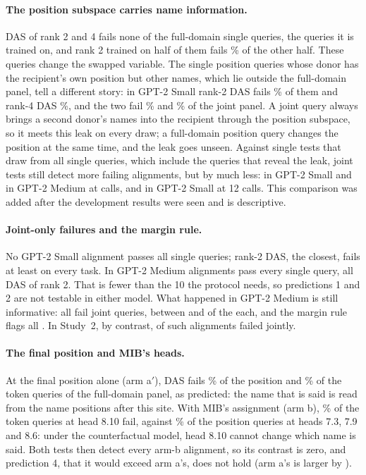 \paragraph{The position subspace carries name information.} DAS of rank 2 and 4 fails none of the full-domain single
queries, the queries it is trained on, and rank 2 trained on half of them fails \SplitHeldOutS\% of the other half.
These queries change the swapped variable. The single position queries whose donor has the recipient's own position
but other names, which lie outside the full-domain panel, tell a different story: in GPT-2 Small rank-2 DAS fails
\UnchRTwoS\% of them and rank-4 DAS \UnchRFourS\%, and the two fail \JointRTwoS\% and \JointRFourS\% of the joint panel.
A joint query always brings a second donor's names into the recipient through the position subspace, so it meets this
leak on every draw; a full-domain position query changes the position at the same time, and the leak goes unseen.
Against single tests that draw from all single queries, which include the queries that reveal the leak, joint tests
still detect more failing alignments, but by much less: \ContrastAllS{} in GPT-2 Small and \ContrastAllM{} in GPT-2
Medium at \Budget{} calls, and \ContrastAllSAtTwelve{} in GPT-2 Small at 12 calls. This comparison was added after the
development results were seen and is descriptive.

\paragraph{Joint-only failures and the margin rule.} No GPT-2 Small alignment passes all \NSingle{} single queries;
rank-2 DAS, the closest, fails at least \MinSingleFailRTwoS{} on every task. In GPT-2 Medium \PerfectWordM{} alignments
pass every single query, all DAS of rank 2. That is fewer than the 10 the protocol needs, so predictions 1 and 2 are
not testable in either model. What happened in GPT-2 Medium is still informative: all \PerfectWordM{} fail joint
queries, between \MedJointFailMin{} and \MedJointFailMax{} of the \NJoint{} each, and the margin rule flags all
\PerfectWordM. In Study~2, by contrast, \TrnPerfectJointFail{} of \TrnPerfect{} such alignments failed jointly.

\paragraph{The final position and MIB's heads.} At the final position alone (arm a$'$), DAS fails \EndRateA\% of the
position and \EndRateB\% of the token queries of the full-domain panel, as predicted: the name that is said is read
from the name positions after this site. With MIB's assignment (arm b), \HeadsRateB\% of the token queries at head 8.10
fail, against \HeadsRateA\% of the position queries at heads 7.3, 7.9 and 8.6: under the counterfactual model, head
8.10 cannot change which name is said. Both tests then detect every arm-b alignment, so its contrast is zero, and
prediction 4, that it would exceed arm a's, does not hold (arm a's is larger by
\HeadsMinusOneAbs{}\ci{\HeadsMinusOneCILoAbs}{\HeadsMinusOneCIHiAbs}).

